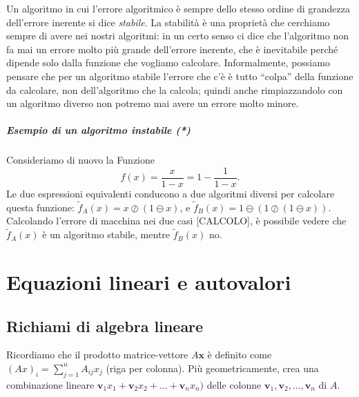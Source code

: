 \documentclass[a4paper]{report}
\theoremstyle{definiton}
\theoremstyle{remark}
\begin{document}
Un algoritmo in cui l'errore algoritmico è sempre dello stesso ordine di grandezza dell'errore inerente si dice \emph{stabile}. La stabilità  è una proprietà che cerchiamo sempre di avere nei nostri algoritmi: in un certo senso ci dice che l'algoritmo non fa mai un errore molto più grande dell'errore inerente, che è inevitabile perché dipende solo dalla funzione che vogliamo calcolare. Informalmente, possiamo pensare che per un algoritmo stabile l'errore che c'è è tutto ``colpa'' della funzione da calcolare, non dell'algoritmo che la calcola; quindi anche rimpiazzandolo con un algoritmo diverso non potremo mai avere un errore molto minore.

\paragraph{Esempio di un algoritmo instabile (*)}
Consideriamo di nuovo la Funzione
\[
    f(x) = \frac{x}{1-x} = 1 - \frac{1}{1-x}.
\]
Le due espressioni equivalenti conducono a due algoritmi diversi per calcolare questa funzione: $\tilde{f}_A(x) = x \oslash (1 \ominus x)$, e $\tilde{f}_B(x) = 1 \ominus \left(1\oslash (1\ominus x)\right)$. Calcolando l'errore di macchina nei due casi [CALCOLO], è possibile vedere che $\tilde{f}_A(x)$ è un algoritmo stabile, mentre $\tilde{f}_B(x)$ no.

\chapter{Equazioni lineari e autovalori}

\section{Richiami di algebra lineare}

Ricordiamo che il prodotto matrice-vettore $A \mathbf{x}$ è definito come $(Ax)_i = \sum_{j=1}^n A_{ij}x_j$ (riga per colonna). Più geometricamente, crea una combinazione lineare $\mathbf{v}_1 x_1 + \mathbf{v}_2 x_2 + \dots + \mathbf{v}_n x_n)$ delle colonne $\mathbf{v}_1, \mathbf{v}_2, \dots, \mathbf{v}_n$ di $A$. 

\end{document}
